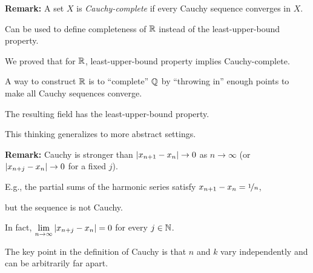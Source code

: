 \documentclass[10pt,aspectratio=169]{beamer}
\begin{document}
\begin{frame}

\textbf{Remark:}
A set $X$ is
\emph{Cauchy-complete}
if every Cauchy sequence converges in $X$.

\pause
Can be used to define completeness of ${\mathbb{R}}$ instead of
the least-upper-bound property.

\pause
We proved that for ${\mathbb{R}}$,
least-upper-bound property implies
Cauchy-complete.

\pause
A way to construct ${\mathbb{R}}$ is to
``complete'' ${\mathbb{Q}}$ by ``throwing in'' enough points to make all
Cauchy sequences converge.

\pause
The resulting field has the
least-upper-bound property.

\pause
This thinking generalizes to more abstract settings.

\pause
\medskip

\textbf{Remark:}
Cauchy is stronger than
$\left\lvert {x_{n+1}-x_n} \right\rvert \to 0$
as $n \to \infty$
%
\pause
(or $\left\lvert {x_{n+j}-x_n} \right\rvert \to 0$ for a fixed $j$).

\pause
E.g., the partial sums of the harmonic series satisfy
$x_{n+1}-x_n = \nicefrac{1}{n}$,

but the sequence is not Cauchy.

\pause
In fact,
$\lim\limits_{n\to\infty} \left\lvert {x_{n+j}-x_n} \right\rvert = 0$ for
every $j \in {\mathbb{N}}$.

\pause
The key point in the definition of Cauchy is that $n$ and $k$
vary independently and can be arbitrarily far apart.

\end{frame}
\end{document}
